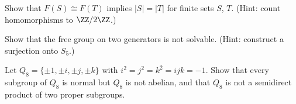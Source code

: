 \begin{exercise}\label{groups:exercise-free-group-rank}
Show that $F(S) \cong F(T)$ implies $|S| = |T|$ for finite sets $S$, $T$. (Hint: count
homomorphisms to $\ZZ/2\ZZ$.)
\end{exercise}

\begin{exercise}\label{groups:exercise-free-group-nonabelian}
Show that the free group on two generators is not solvable. (Hint: construct a
surjection onto $S_5$.)
\end{exercise}

\begin{exercise}\label{groups:exercise-q8}
Let $Q_8 = \{\pm 1, \pm i, \pm j, \pm k\}$ with $i^2 = j^2 = k^2 = ijk = -1$. Show that
every subgroup of $Q_8$ is normal but $Q_8$ is not abelian, and that $Q_8$ is not a
semidirect product of two proper subgroups.
\end{exercise}

